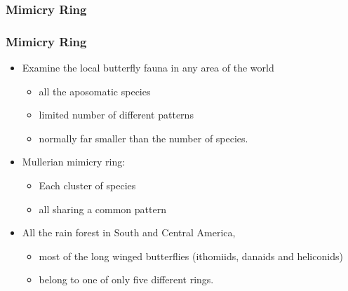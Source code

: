 \subsubsection{Mimicry Ring}

\frame
{
	\frametitle{Mimicry Ring}
	
	\begin{itemize}
		\item Examine the local butterfly fauna in any area of the world
		\begin{itemize}
			\item all the aposomatic species
			\item limited number of different patterns
			\item normally far smaller than the number of species.
		\end{itemize}
		\item Mullerian mimicry ring: 
			\begin{itemize}
				\item Each cluster of species
				\item all sharing a common pattern
			\end{itemize}		
		\item All the rain forest in South and Central America,
		\begin{itemize}
			\item most of the long winged butterflies (ithomiids, danaids and heliconids) 
			\item belong to one of only five different rings.
		\end{itemize}
	\end{itemize}	
}